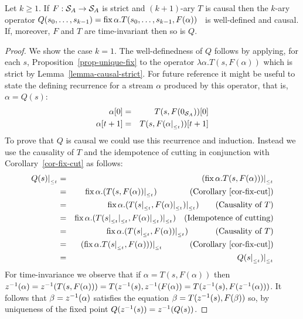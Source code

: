 \begin{corollary}\label{feedback-semantics}
\label{cor-loop}
Let $k\geq1$. If $F: \mathcal{S}_{A} \to \mathcal{S}_{A}$ is strict and $(k+1)$-ary $T$ is causal then the $k$-ary
operator $Q(s_0,\ldots,s_{k-1})=\mbox{fix}\,\alpha.T(s_0,\ldots,s_{k-1},F(\alpha))$~ is well-defined and causal.
If, moreover, $F$ and $T$ are time-invariant then so is $Q$.
\end{corollary}
\begin{proof} We show the case $k=1$.
The well-definedness of $Q$ follows by applying, for each $s$, Proposition~\ref{prop-unique-fix}
to the operator
$\lambda\alpha.T(s,F(\alpha))$ which is strict by Lemma~\ref{lemma-causal-strict}.
For future reference it might be useful to state the defining recurrence for a stream $\alpha$
produced by this operator, that is, $\alpha=Q(s)$:
\begin{eqnarray*}
\alpha[0] & = &  T(s,F(0_{\mathcal{S}_{A}}))[0]\\
\alpha[t+1] & = & T(s,F(\alpha|_{_{\leq t}}))[t+1]
\end{eqnarray*}
To prove that $Q$ is causal we could use this recurrence and induction. Instead
we use the causality of $T$ and the idempotence of cutting in conjunction with
Corollary~\ref{cor-fix-cut} as follows:
\begin{eqnarray*}
Q(s)|_{_{\leq t}} & = &  (\mbox{fix}\,\alpha.T(s,F(\alpha)))|_{_{\leq t}}\\
         & = &  \mbox{fix}\,\alpha.(T(s,F(\alpha))|_{_{\leq t}})~~~~~~~~~~~~\mbox{(Corollary~\ref{cor-fix-cut})}\\
         & = &  \mbox{fix}\,\alpha.(T(s|_{_{\leq t}},F(\alpha)|_{_{\leq t}})|_{_{\leq t}})~~~~~~\mbox{(Causality of $T$)}\\
         & = &  \mbox{fix}\,\alpha.(T(s|_{_{\leq t}}|_{_{\leq t}},F(\alpha)|_{_{\leq t}})|_{_{\leq t}})~~~\mbox{(Idempotence of cutting)}\\
         & = &  \mbox{fix}\,\alpha.(T(s|_{_{\leq t}},F(\alpha))|_{_{\leq t}})~~~~~~~~~~\mbox{(Causality of $T$)}\\
         & = & (\mbox{fix}\,\alpha.T(s|_{_{\leq t}},F(\alpha)))|_{_{\leq t}}~~~~~~~~~~\mbox{(Corollary~\ref{cor-fix-cut})}\\
         & = & Q(s|_{_{\leq t}})|_{_{\leq t}}
\end{eqnarray*}
For time-invariance we observe that if $\alpha=T(s,F(\alpha))$ then
$z^{-1}(\alpha)= \\ z^{-1}(T(s,F(\alpha)))=T(z^{-1}(s),z^{-1}(F(\alpha))=
T(z^{-1}(s),F(z^{-1}(\alpha)))$. It follows that $\beta=z^{-1}(\alpha)$ satisfies the equation $\beta=T(z^{-1}(s),F(\beta))$ so,
by uniqueness of the fixed point $Q(z^{-1}(s))=z^{-1}(Q(s))$.
\end{proof}




